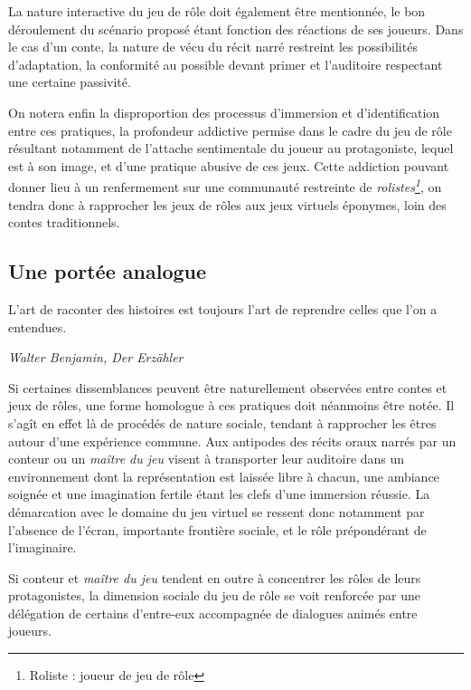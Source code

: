 La nature interactive du jeu de rôle doit également être mentionnée, le bon déroulement du scénario proposé étant fonction des réactions de ses joueurs. Dans le cas d'un conte, la nature de vécu du récit narré restreint les possibilités d'adaptation, la conformité au possible devant primer et l'auditoire respectant une certaine passivité.

On notera enfin la disproportion des processus d'immersion et d'identification entre ces pratiques, la profondeur addictive permise dans le cadre du jeu de rôle résultant notamment de l'attache sentimentale du joueur au protagoniste, lequel est à son image, et d'une pratique abusive de ces jeux. Cette addiction pouvant donner lieu à un renfermement sur une communauté restreinte de \textit{rolistes\footnote{Roliste : joueur de jeu de rôle}}, on tendra donc à rapprocher les jeux de rôles aux jeux virtuels éponymes, loin des contes traditionnels.



\subsection{Une portée analogue}

\begin{shadequote}
L'art de raconter des histoires est toujours l'art de reprendre celles que l'on a entendues. \par\emph{Walter Benjamin, Der Erzähler}
\end{shadequote}


Si certaines dissemblances peuvent être naturellement observées entre contes et jeux de rôles, une forme homologue à ces pratiques doit néanmoins être notée. Il s'agît en effet là de procédés de nature sociale, tendant à rapprocher les êtres autour d'une expérience commune. Aux antipodes des récits oraux narrés par un conteur ou un \textit{maître du jeu} visent à transporter leur auditoire dans un environnement dont la représentation est laissée libre à chacun, une ambiance soignée et une imagination fertile étant les clefs d'une immersion réussie. La démarcation avec le domaine du jeu virtuel se ressent donc notamment par l'absence de l'écran, importante frontière sociale, et le rôle prépondérant de l'imaginaire.

Si conteur et \textit{maître du jeu} tendent en outre à concentrer les rôles de leurs protagonistes, la dimension sociale du jeu de rôle se voit renforcée par une délégation de certains d'entre-eux accompagnée de dialogues animés entre joueurs.\\


